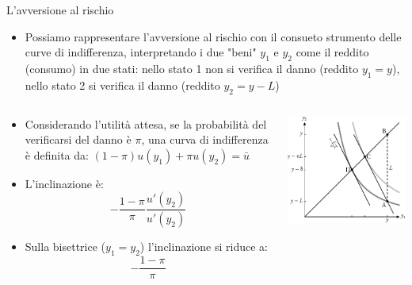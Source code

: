 \documentclass[aspectratio=64,11pt]{beamer}
\begin{document}
\begin{frame}{L'avversione al rischio}
\begin{itemize}
\item Possiamo rappresentare l'avversione al rischio con il consueto strumento
delle curve di indifferenza, interpretando i due "beni" \(y_1\) e \(y_2\) come
il reddito (consumo) in due stati: nello stato 1 non si verifica il danno
(reddito \(y_1=y\)), nello stato 2 si verifica il danno (reddito \(y_2=y-L\))
\end{itemize}
\begin{columns}
\begin{column}{.5\columnwidth}
\begin{itemize}
\item Considerando l'utilità attesa, se la probabilità del verificarsi del
danno è \(\pi\), una curva di indifferenza è definita da: \((1-\pi)u(y_1)+\pi
  u(y_2)=\bar u\)
\item L'inclinazione è:
$$ -\frac{1-\pi}{\pi}\frac{u'(y_2)}{u'(y_2)} $$
\item Sulla
bisettrice (\(y_1=y_2\)) l'inclinazione si riduce a: $$ -\frac{1-\pi}{\pi} $$
\end{itemize}
\end{column}
\begin{column}{.5\columnwidth}
\begin{center}
\includegraphics[width=.9\textwidth]{./figure/rischio-1.pdf}
\end{center}
\end{column}
\end{columns}
\end{frame}
\end{document}

